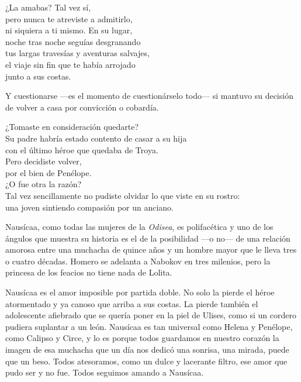 \begin{versopropio}
¿La amabas? Tal vez sí,\\
pero nunca te atreviste a admitirlo,\\
ni siquiera a ti mismo. En su lugar,\\
noche tras noche seguías desgranando\\
tus largas travesías y aventuras salvajes,\\
el viaje sin fin que te había arrojado\\
junto a sus costas.
\end{versopropio}

Y cuestionarse ---es el momento de cuestionárselo todo--- si mantuvo su decisión de volver a casa por convicción o cobardía.

\begin{versopropio}
¿Tomaste en consideración quedarte?\\
Su padre habría estado contento de casar a su hija\\
con el último héroe que quedaba de Troya.\\
Pero decidiste volver,\\
por el bien de Penélope.\\
¿O fue otra la razón?\\
Tal vez sencillamente no pudiste olvidar lo que viste en su rostro:\\
una joven sintiendo compasión por un anciano.
\end{versopropio}

Nausícaa, como todas las mujeres de la \emph{Odisea}, es polifacética y uno de los ángulos que muestra su historia es el de la posibilidad ---o no--- de una relación amorosa entre una muchacha de quince años y un hombre mayor que le lleva tres o cuatro décadas. Homero se adelanta a Nabokov en tres milenios, pero la princesa de los feacios no tiene nada de Lolita.

Nausícaa es el amor imposible por partida doble. No solo la pierde el héroe atormentado y ya canoso que arriba a sus costas. La pierde también el adolescente afiebrado que se quería poner en la piel de Ulises, como si un cordero pudiera suplantar a un león. Nausícaa es tan universal como Helena y Penélope, como Calipso y Circe, y lo es porque todos guardamos en nuestro corazón la imagen de esa muchacha que un día nos dedicó una sonrisa, una mirada, puede que un beso. Todos atesoramos, como un dulce y lacerante filtro, ese amor que pudo ser y no fue. Todos seguimos amando a Nausícaa.
